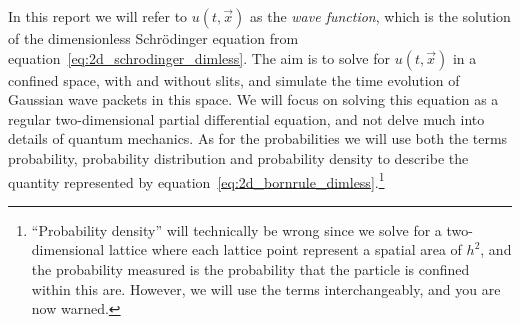     In this report we will refer to $u(t, \vec{x})$ as the \textit{wave function}, which is the solution of the dimensionless Schrödinger equation from equation~\eqref{eq:2d_schrodinger_dimless}. The aim is to solve for $u(t,\vec{x})$ in a confined space, with and without slits, and simulate the time evolution of Gaussian wave packets in this space. We will focus on solving this equation as a regular two-dimensional partial differential equation, and not delve much into details of quantum mechanics. As for the probabilities we will use both the terms probability,  probability distribution and probability density to describe the quantity represented by equation~\eqref{eq:2d_bornrule_dimless}.\footnote{``Probability density'' will technically be wrong since we solve for a two-dimensional lattice where each lattice point represent a spatial area of $h^2$, and the probability measured is the probability that the particle is confined within this are. However, we will use the terms interchangeably, and you are now warned.}